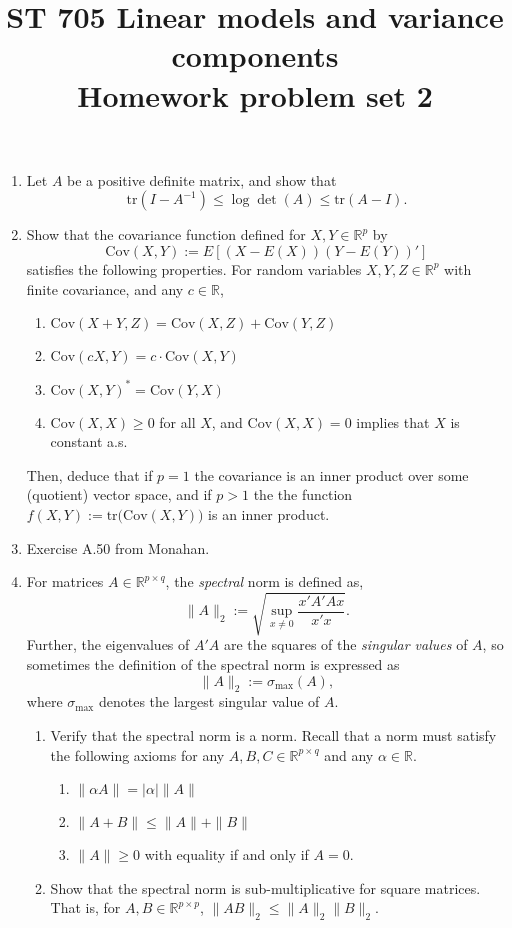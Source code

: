 \documentclass[11pt]{article}
\title{ST 705 Linear models and variance components \\ 
        Homework problem set 2}
\begin{document}
\maketitle

\begin{enumerate}

\item Let $A$ be a positive definite matrix, and show that 
\[
\text{tr}(I - A^{-1}) \le \log\det(A) \le \text{tr}(A - I).
\]

\item Show that the covariance function defined for $X, Y \in \mathbb{R}^{p}$ by
\[
\text{Cov}(X,Y) := E[(X - E(X))(Y - E(Y))']
\]
satisfies the following properties.  For random variables $X, Y, Z \in \mathbb{R}^{p}$ with finite covariance, and any $c \in \mathbb{R}$,
\begin{enumerate}
\item $\text{Cov}(X+Y,Z) = \text{Cov}(X,Z) + \text{Cov}(Y,Z)$
\item $\text{Cov}(cX,Y) = c\cdot \text{Cov}(X,Y)$
\item $\text{Cov}(X,Y)^{*} = \text{Cov}(Y,X)$
\item $\text{Cov}(X,X) \ge 0$ for all $X$, and $\text{Cov}(X,X) = 0$ implies that $X$ is constant a.s.
\end{enumerate}
Then, deduce that if $p = 1$ the covariance is an inner product over some (quotient) vector space, and if $p > 1$ the the function $f(X,Y) := \text{tr}\big(\text{Cov}(X,Y)\big)$ is an inner product.

\item Exercise A.50 from Monahan.

\item For matrices $A \in \mathbb{R}^{p\times q}$, the \textit{spectral} norm is defined as,
\[
\|A\|_{2} := \sqrt{\sup_{x\ne0}\frac{x'A'Ax}{x'x}}.
\]
Further, the eigenvalues of $A'A$ are the squares of the \textit{singular values} of $A$, so sometimes the definition of the spectral norm is expressed as
 \[
\|A\|_{2} := \sigma_{\max}(A),
\]
where $\sigma_{\max}$ denotes the largest singular value of $A$. 
\begin{enumerate}
\item Verify that the spectral norm is a norm.  Recall that a norm must satisfy the following axioms for any $A,B,C \in \mathbb{R}^{p\times q}$ and any $\alpha \in \mathbb{R}$.
\begin{enumerate}
\item $\|\alpha A\| = |\alpha|\|A\|$
\item $\|A + B\| \le \|A\| + \|B\|$
\item $\|A\| \ge 0$ with equality if and only if $A = 0$.
\end{enumerate}
\item Show that the spectral norm is sub-multiplicative for square matrices.  That is, for $A,B \in \mathbb{R}^{p\times p}$, $\|AB\|_{2} \le \|A\|_{2}\|B\|_{2}$.  
\end{enumerate}


\end{enumerate}
\end{document}
